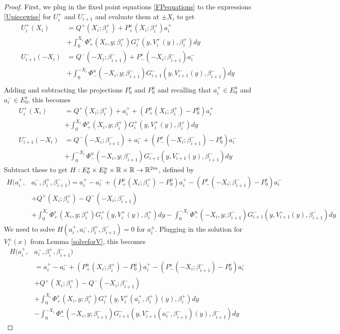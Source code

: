 \documentclass[thesis.tex]{subfiles}
\begin{document}
\begin{lemma}
\begin{proof}
First, we plug in the fixed point equations \eqref{FPequations} to the expressions \eqref{Upiecewise} for $U_i^+$ and $U_{i+1}^-$ and evaluate them at $\pm X_i$ to get
\begin{align*}
U_i^+(X_i) &= Q^+(X_i; \beta_i^+) + P^u_+(X_i; \beta_i^+) a_i^+ \\
&+ \int_0^{X_i} \Phi_+^s(X_i, y; \beta_i^+) G_i^+(y, V_i^+(y),\beta_i^+)dy \\ 
U_{i+1}^-(-X_i) &= Q^-(-X_i; \beta_{i+1}^-) + P^s_-(-X_i; \beta_{i+1}^-) a_i^- \\
&+ \int_0^{-X_i} \Phi_-^u(-X_i, y; \beta_{i+1}^-) G_{i+1}^-(y, V_{i+1}^-(y),\beta_{i+1}^-)dy \\
\end{align*}
Adding and subtracting the projections $P_0^s$ and $P_0^u$ and recalling that $a_i^+ \in E_0^u$ and $a_i^- \in E_0^s$, this becomes
\begin{align*}
U_i^+(X_i) &= Q^+(X_i; \beta_i^+) + a_i^+ + (P^u_+(X_i; \beta_i^+) -  P^u_0)a_i^+ \\
&+ \int_0^{X_i} \Phi_+^s(X_i, y; \beta_i^+) G_i^+(y, V_i^+(y),\beta_i^+)dy \\ 
U_{i+1}^-(-X_i) &= Q^-(-X_i; \beta_{i+1}^-) + a_i^- + (P^s_-(-X_i; \beta_{i+1}^-) - P^s_0) a_i^- \\ 
&+ \int_0^{-X_i} \Phi_-^u(-X_i, y; \beta_{i+1}^-) G_{i+1}^-(y, V_{i+1}^-(y),\beta_{i+1}^-)dy
\end{align*}
Subtract these to get $H: E_0^s \times E_0^u \times \mathbb{R} \times \mathbb{R} \rightarrow \mathbb{R}^{2m}$, defined by
\begin{align*}
H(a_i^+, &a_i^-, \beta_i^+, \beta_{i+1}^-) 
= a_i^+ - a_i^- + (P^u_+(X_i; \beta_i^+) -  P^u_0)a_i^+ - (P^s_-(-X_i; \beta_{i+1}^-) - P^s_0) a_i^-  \\
&+ Q^+(X_i; \beta_i^+) - Q^-(-X_i; \beta_{i+1}^-)\\
&+ \int_0^{X_i} \Phi_+^s(X_i, y; \beta_i^+) G_i^+(y, V_i^+(y),\beta_i^+)dy
- \int_0^{-X_i} \Phi_-^u(-X_i, y; \beta_{i+1}^-) G_{i+1}^-(y, V_{i+1}^-(y),\beta_{i+1}^-)dy 
\end{align*}
We need to solve $H(a_i^+, a_i^-, \beta_i^+, \beta_{i+1}^-) = 0$ for $a_i^\pm$. Plugging in the solution for $V_i^\pm(x)$ from Lemma \ref{solveforV}, this becomes
\begin{align*}
H(a_i^+, &a_i^-, \beta_i^+, \beta_{i+1}^-) \\
&= a_i^+ - a_i^- + (P^u_+(X_i; \beta_i^+) -  P^u_0)a_i^+ - (P^s_-(-X_i; \beta_{i+1}^-) - P^s_0) a_i^-  \\
&+ Q^+(X_i; \beta_i^+) - Q^-(-X_i; \beta_{i+1}^-) \\
&+ \int_0^{X_i} \Phi_+^s(X_i, y; \beta_i^+) G_i^+(y, V_i^+(a_i^+, \beta_i^+)(y),\beta_i^+)dy \\
&- \int_0^{-X_i} \Phi_-^u(-X_i, y; \beta_{i+1}^-) G_{i+1}^-(y, V_{i+1}^-(a_i^-, \beta_{i+1}^-)(y),\beta_{i+1}^-)dy 
\end{align*}


\end{proof}
\end{lemma}
\end{document}
